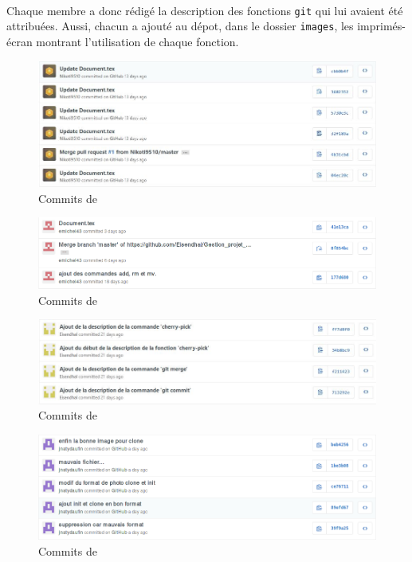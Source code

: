 \documentclass[11pt,canadien]{article}
\begin{document}
\paragraph{}Chaque membre a donc rédigé la description des fonctions \texttt{git} qui lui avaient été attribuées. Aussi, chacun a ajouté au dépot, dans le dossier \texttt{images}, les imprimés-écran montrant l'utilisation de chaque fonction.

\begin{figure}[h]
	\centering
	\includegraphics[width=\textwidth]{images/commit_antoine.JPG}
	\caption{Commits de \antoine}
\end{figure}

\begin{figure}[h]
	\centering
	\includegraphics[width=\textwidth]{images/commit_estelle.png}
	\caption{Commits de \estelle}
\end{figure}

\begin{figure}[h]
	\centering
	\includegraphics[width=\textwidth]{images/commit_joffrey.JPG}
	\caption{Commits de \joffrey}
\end{figure}

\begin{figure}[h]
	\centering
	\includegraphics[width=\textwidth]{images/commit_julien.png}
	\caption{Commits de \julien}
\end{figure}
\end{document}
